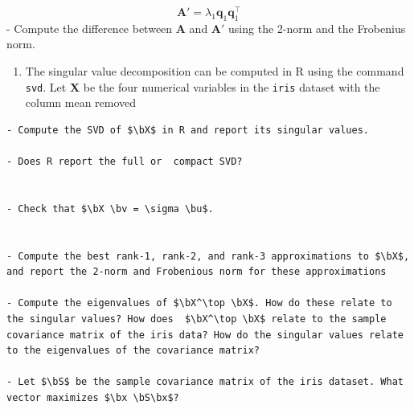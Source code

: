 \documentclass[]{book}
\newenvironment{Shaded}{\begin{snugshade}}{\end{snugshade}}
\newcommand{\CommentTok}[1]{\textcolor[rgb]{0.56,0.35,0.01}{\textit{#1}}}
\newcommand{\DecValTok}[1]{\textcolor[rgb]{0.00,0.00,0.81}{#1}}
\newcommand{\KeywordTok}[1]{\textcolor[rgb]{0.13,0.29,0.53}{\textbf{#1}}}
\newcommand{\NormalTok}[1]{#1}
\newcommand{\OperatorTok}[1]{\textcolor[rgb]{0.81,0.36,0.00}{\textbf{#1}}}
\newcommand{\StringTok}[1]{\textcolor[rgb]{0.31,0.60,0.02}{#1}}
\providecommand{\tightlist}{%
  \setlength{\itemsep}{0pt}\setlength{\parskip}{0pt}}
\theoremstyle{definition}
\theoremstyle{definition}
\theoremstyle{definition}
\theoremstyle{remark}
\begin{document}
\[\boldsymbol A' = \lambda_1 \boldsymbol q_1 \boldsymbol q_1^\top\]
- Compute the difference between \(\boldsymbol A\) and \(\boldsymbol A'\) using the 2-norm and the Frobenius norm.

\begin{enumerate}
\def\labelenumi{\arabic{enumi}.}
\setcounter{enumi}{1}
\tightlist
\item
  The singular value decomposition can be computed in R using the command \texttt{svd}. Let \(\boldsymbol X\) be the four numerical variables in the \texttt{iris} dataset with the column mean removed
\end{enumerate}

\begin{Shaded}
\end{Shaded}

\begin{verbatim}
- Compute the SVD of $\bX$ in R and report its singular values.

- Does R report the full or  compact SVD?


- Check that $\bX \bv = \sigma \bu$.


- Compute the best rank-1, rank-2, and rank-3 approximations to $\bX$, and report the 2-norm and Frobenious norm for these approximations

- Compute the eigenvalues of $\bX^\top \bX$. How do these relate to the singular values? How does  $\bX^\top \bX$ relate to the sample covariance matrix of the iris data? How do the singular values relate to the eigenvalues of the covariance matrix?

- Let $\bS$ be the sample covariance matrix of the iris dataset. What vector maximizes $\bx \bS\bx$? 
\end{verbatim}
\end{document}
